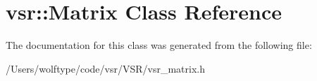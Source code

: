 \hypertarget{classvsr_1_1_matrix}{\section{vsr\-:\-:Matrix Class Reference}
\label{classvsr_1_1_matrix}
}


The documentation for this class was generated from the following file\-:\begin{DoxyCompactItemize}
\item 
/\-Users/wolftype/code/vsr/\-V\-S\-R/vsr\-\_\-matrix.\-h\end{DoxyCompactItemize}
